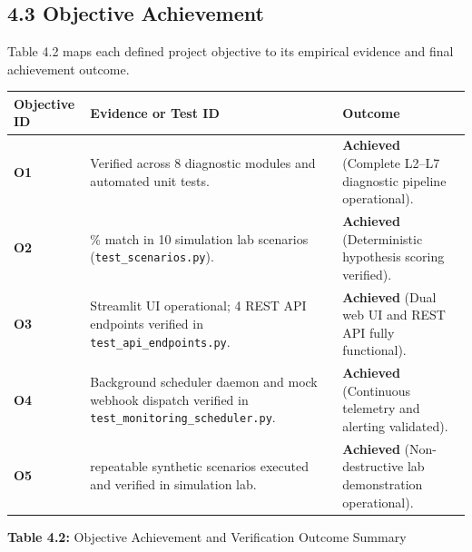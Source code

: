\documentclass[
]{article}
\newcounter{none} %
\begin{document}
\subsection{4.3 Objective Achievement}\label{objective-achievement}

Table 4.2 maps each defined project objective to its empirical evidence and final achievement outcome.

{\def\LTcaptype{none} %
\begin{longtable}[]{@{}
  >{\raggedright\arraybackslash}p{}
  >{\raggedright\arraybackslash}p{}
  >{\raggedright\arraybackslash}p{}@{}}
\toprule\noalign{}
\begin{minipage}[b]{\linewidth}\raggedright
\textbf{Objective ID}
\end{minipage} & \begin{minipage}[b]{\linewidth}\raggedright
\textbf{Evidence or Test ID}
\end{minipage} & \begin{minipage}[b]{\linewidth}\raggedright
\textbf{Outcome}
\end{minipage} \\
\midrule\noalign{}
\endhead
\bottomrule\noalign{}
\endlastfoot
\textbf{O1} & Verified across 8 diagnostic modules and automated unit tests. & \textbf{Achieved} (Complete L2--L7 diagnostic pipeline operational). \\
\textbf{O2} & 100\% match in 10 simulation lab scenarios (\texttt{test\_scenarios.py}). & \textbf{Achieved} (Deterministic hypothesis scoring verified). \\
\textbf{O3} & Streamlit UI operational; 4 REST API endpoints verified in \texttt{test\_api\_endpoints.py}. & \textbf{Achieved} (Dual web UI and REST API fully functional). \\
\textbf{O4} & Background scheduler daemon and mock webhook dispatch verified in \texttt{test\_monitoring\_scheduler.py}. & \textbf{Achieved} (Continuous telemetry and alerting validated). \\
\textbf{O5} & 10 repeatable synthetic scenarios executed and verified in simulation lab. & \textbf{Achieved} (Non-destructive lab demonstration operational). \\
\end{longtable}
}

\begin{center}
\textbf{Table 4.2:} Objective Achievement and Verification Outcome Summary
\end{center}
\end{document}
